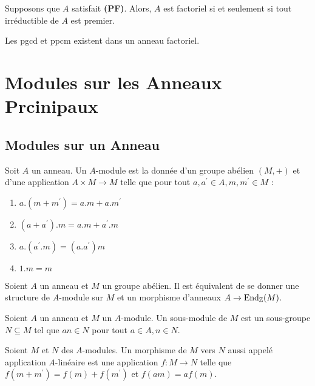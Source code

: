 \documentclass{cours}
\begin{document}
\begin{proposition}
    Supposons que $A$ satisfait \textbf{(PF)}. Alors, $A$ est factoriel si et seulement si tout irréductible de $A$ est premier. 
\end{proposition}

\begin{lemma}
    Les pgcd et ppcm existent dans un anneau factoriel.
\end{lemma}


\section{Modules sur les Anneaux Prcinipaux}
\subsection{Modules sur un Anneau}
\begin{definition}
    Soit $A$ un anneau. Un $A$-module est la donnée d'un groupe abélien $\left(M, +\right)$ et d'une application $A \times M \rightarrow M$ telle que pour tout $a, a^{'} \in A, m, m^{'} \in M$ : 
    \begin{enumerate}
        \item $a.(m+m^{'}) = a.m + a.m^{'}$
        \item $(a+a^{'}).m = a.m + a^{'}.m$
        \item $a.(a^{'}.m) = (a.a^{'})m$
        \item $1.m = m$
    \end{enumerate}
\end{definition}

\begin{proposition}
    Soient $A$ un anneau et $M$ un groupe abélien. Il est équivalent de se donner une structure de $A$-module sur $M$ et un morphisme d'anneaux $A \rightarrow \text{End}_{\mathbb{Z}}(M)$.
\end{proposition}

\begin{definition}
    Soient $A$ un anneau et $M$ un $A$-module. Un sous-module de $M$ est un sous-groupe $N \subseteq M$ tel que $an \in N$ pour tout $a \in A, n \in N$. 
\end{definition}
\begin{definition}
    Soient $M$ et $N$ des $A$-modules. Un morphisme de $M$ vers $N$ aussi appelé application $A$-linéaire est une application $f : M \to N$ telle que $f(m + m^{'}) = f(m) + f(m^{'})$ et $f(am) = af(m)$.
\end{definition}
\end{document}
